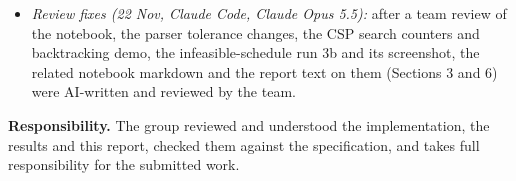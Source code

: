 \begin{itemize}
\begin{itemize}
    analysis draft were AI-written. \textbf{The first report draft was completely written with Claude Code}
    from our code, decision log and measured results, and converted to LaTeX with it. The notebook's
    markdown cells and the test-run screenshots were also AI-assisted. All numbers in this report
    come from running the submitted code.
      \item \emph{Review fixes (22 Nov, Claude Code, Claude Opus 5.5):} after a team review of the
    notebook, the parser tolerance changes, the CSP search counters and backtracking demo, the
    infeasible-schedule run 3b and its screenshot, the related notebook markdown and the report
    text on them (Sections 3 and 6) were AI-written and reviewed by the team.
    \end{itemize}
\end{itemize}

\textbf{Responsibility.} The group reviewed and understood the implementation, the results and this
report, checked them against the specification, and takes full responsibility for the submitted
work.

